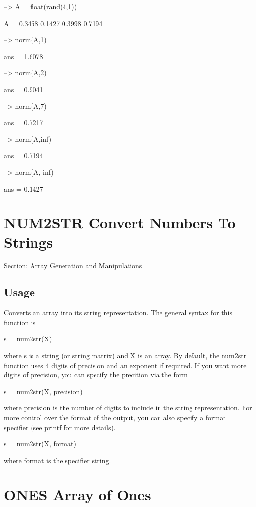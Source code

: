 \begin{DoxyVerbInclude}
--> A = float(rand(4,1))

A = 
    0.3458 
    0.1427 
    0.3998 
    0.7194 

--> norm(A,1)

ans = 
    1.6078 

--> norm(A,2)

ans = 
    0.9041 

--> norm(A,7)

ans = 
    0.7217 

--> norm(A,inf)

ans = 
    0.7194 

--> norm(A,-inf)

ans = 
    0.1427 
\end{DoxyVerbInclude}
 \hypertarget{array_num2str}{}\section{N\-U\-M2\-S\-T\-R Convert Numbers To Strings}\label{array_num2str}
Section\-: \hyperlink{sec_array}{Array Generation and Manipulations} \hypertarget{vtkwidgets_vtkxyplotwidget_Usage}{}\subsection{Usage}\label{vtkwidgets_vtkxyplotwidget_Usage}
Converts an array into its string representation. The general syntax for this function is \begin{DoxyVerb}   s = num2str(X)
\end{DoxyVerb}
 where {\ttfamily s} is a string (or string matrix) and {\ttfamily X} is an array. By default, the {\ttfamily num2str} function uses 4 digits of precision and an exponent if required. If you want more digits of precision, you can specify the precition via the form \begin{DoxyVerb}   s = num2str(X, precision)
\end{DoxyVerb}
 where {\ttfamily precision} is the number of digits to include in the string representation. For more control over the format of the output, you can also specify a format specifier (see {\ttfamily printf} for more details). \begin{DoxyVerb}   s = num2str(X, format)
\end{DoxyVerb}
 where {\ttfamily format} is the specifier string. \hypertarget{array_ones}{}\section{O\-N\-E\-S Array of Ones}\label{array_ones}
